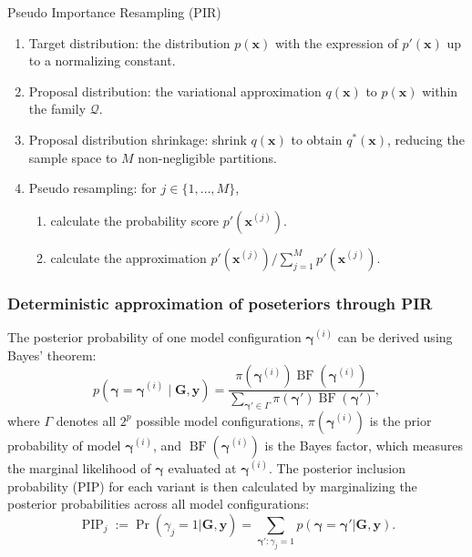 \documentclass[pdflatex,sn-mathphys-num]{sn-jnl}%
\theoremstyle{thmstyleone}%
\theoremstyle{thmstyletwo}%
\theoremstyle{thmstylethree}%
\begin{document}
\begin{algorithm}
\caption{Pseudo Importance Resampling (PIR)}
\label{alg:variational_pir}
\begin{enumerate}
    \item Target distribution: the distribution $p\left(\mathbf{x}\right)$ with the expression of \(p'\left(\mathbf{x}\right)\) up to a normalizing constant.
    \item Proposal distribution: the variational approximation \( q\left(\mathbf{x}\right) \) to \( p\left(\mathbf{x}\right) \) within the family $\mathcal{Q}$.
    \item Proposal distribution shrinkage: shrink $q\left(\mathbf{x}\right)$ to obtain $q^*\left(\mathbf{x}\right)$, reducing the sample space to $M$ non-negligible partitions.
    \item Pseudo resampling: for \( j \in \{1, \dots, M\} \),
    \begin{enumerate}
        \item calculate the probability score \( p'\left(\mathbf{x}^{(j)}\right) \).
        \item calculate the approximation \( p'\left(\mathbf{x}^{(j)}\right)/ \sum_{j=1}^{M}p'\left(\mathbf{x}^{(j)}\right) \).
    \end{enumerate}
\end{enumerate}
\end{algorithm}

\subsubsection{Deterministic approximation of poseteriors through PIR}\label{subsubsec4}
The posterior probability of one model configuration $\boldsymbol{\gamma}^{(i)}$ can be derived using Bayes' theorem:
$$p\left(\boldsymbol{\gamma} = \boldsymbol{\gamma}^{(i)} \mid \mathbf{G},\mathbf{y}\right)     =\frac{\pi\left(\boldsymbol{\gamma}^{(i)}\right)\operatorname{BF}\left(\boldsymbol{\gamma}^{(i)}\right)}{\sum_{\boldsymbol{\gamma}'\in \Gamma}\pi \left(\boldsymbol{\gamma}'\right)\operatorname{BF}\left(\boldsymbol{\gamma}'\right)},$$
where $\Gamma$ denotes all $2^p$ possible model configurations, $\pi\left(\boldsymbol{\gamma}^{(i)}\right)$ is the prior probability of model $\boldsymbol{\gamma}^{(i)}$, and $\operatorname{BF}\left(\boldsymbol{\gamma}^{(i)}\right)$ is the Bayes factor, which measures the marginal likelihood of $\boldsymbol{\gamma}$ evaluated at $\boldsymbol{\gamma}^{(i)}$. The posterior inclusion probability (PIP) for each variant is then calculated by marginalizing the posterior probabilities across all model configurations:
$$\operatorname{PIP}_j:=\operatorname{Pr}\left(\gamma_j=1|\mathbf{G},\mathbf{y}\right)=\sum_{\boldsymbol{\gamma}':\gamma_j=1} p(\boldsymbol{\gamma}=\boldsymbol{\gamma}'|\mathbf{G},\mathbf{y}).$$
\end{document}
